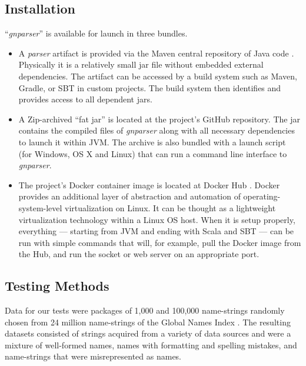 \documentclass{bmcart}
\begin{document}
\subsection*{Installation}

``\textit{gnparser}'' is available for launch in three bundles.

\begin{itemize}
  \item A \textit{parser} artifact is provided via the Maven central repository
    of Java code \cite{maven-globalnames}. Physically it is a relatively small
    jar file without embedded external dependencies. The artifact can be
    accessed by a build system such as Maven, Gradle, or SBT in custom
    projects. The build system then identifies and provides access to all
    dependent jars.

  \item A Zip-archived ``fat jar'' is located at the project's GitHub
    repository. The jar contains the compiled files of \textit{gnparser} along
    with all necessary dependencies to launch it within JVM\@. The archive is
    also bundled with a launch script (for Windows, OS X and Linux) that can
    run a command line interface to \textit{gnparser}.

  \item The project's Docker container image is located at Docker Hub
    \cite{gnparser-docker}.  Docker provides an additional layer of abstraction
    and automation of operating-system-level virtualization on Linux. It can be
    thought as a lightweight virtualization technology within a Linux OS host.
    When it is setup properly, everything --- starting from JVM and ending with
    Scala and SBT --- can be run with simple commands that will, for example,
    pull the Docker image from the Hub, and run the socket or web server on an
    appropriate port.

\end{itemize}

\subsection*{Testing Methods}

Data for our tests were packages of 1,000 and 100,000 name-strings randomly
chosen from 24 million name-strings of the Global Names Index \cite{gn:index}.
The resulting datasets consisted of strings acquired from a variety of data
sources and were a mixture of well-formed names, names with formatting and
spelling mistakes, and name-strings that were misrepresented as names.
\end{document}
